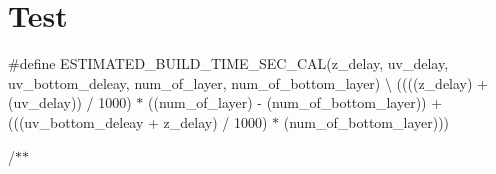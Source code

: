 \hypertarget{group__test}{}\section{Test}
\label{group__test}
\#define E\+S\+T\+I\+M\+A\+T\+E\+D\+\_\+\+B\+U\+I\+L\+D\+\_\+\+T\+I\+M\+E\+\_\+\+S\+E\+C\+\_\+\+C\+A\+L(z\+\_\+delay, uv\+\_\+delay, uv\+\_\+bottom\+\_\+deleay, num\+\_\+of\+\_\+layer, num\+\_\+of\+\_\+bottom\+\_\+layer) \textbackslash{} ((((z\+\_\+delay) + (uv\+\_\+delay)) / 1000) $\ast$ ((num\+\_\+of\+\_\+layer) -\/ (num\+\_\+of\+\_\+bottom\+\_\+layer)) + (((uv\+\_\+bottom\+\_\+deleay + z\+\_\+delay) / 1000) $\ast$ (num\+\_\+of\+\_\+bottom\+\_\+layer)))

/$\ast$$\ast$ 